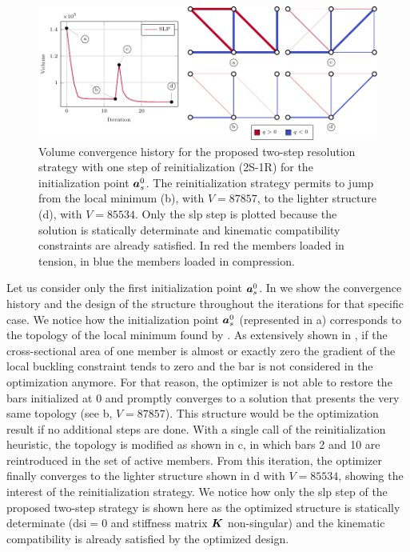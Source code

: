 \begin{figure}
    \centering
    \includegraphics{figures/04_TTO_improvements/10_10_bar_history/10_bar_hist.pdf}
    \caption{Volume convergence history for the proposed two-step resolution strategy with one step of reinitialization (2S-1R) for the initialization point $\bm{a}^0_s$. The reinitialization strategy permits to jump from the local minimum (b), with $V=87857$, to the lighter structure (d), with $V=85534$. Only the \gls{slp} step is plotted because the solution is statically determinate and kinematic compatibility constraints are already satisfied. In red the members loaded in tension, in blue the members loaded in compression.}
    \label{fig:04_10_bar_hist}
\end{figure}

Let us consider only the first initialization point $\bm{a}^0_s$. In  we show the convergence history and the design of the structure throughout the iterations for that specific case. We notice how the initialization point $\bm{a}^0_s$ (represented in a) corresponds to the topology of the local minimum found by . As extensively shown in , if the cross-sectional area of one member is almost or exactly zero the gradient of the local buckling constraint tends to zero and the bar is not considered in the optimization anymore. For that reason, the optimizer is not able to restore the bars initialized at 0 and promptly converges to a solution that presents the very same topology (see b, $V=87857$). This structure would be the optimization result if no additional steps are done. With a single call of the reinitialization heuristic, the topology is modified as shown in c, in which bars 2 and 10 are reintroduced in the set of active members. From this iteration, the optimizer finally converges to the lighter structure shown in d with $V=85534$, showing the interest of the reinitialization strategy. We notice how only the \gls{slp} step of the proposed two-step strategy is shown here as the optimized structure is statically determinate (\gls{dsi}$=0$ and stiffness matrix $\bm{K}$ non-singular) and the kinematic compatibility is already satisfied by the optimized design.

